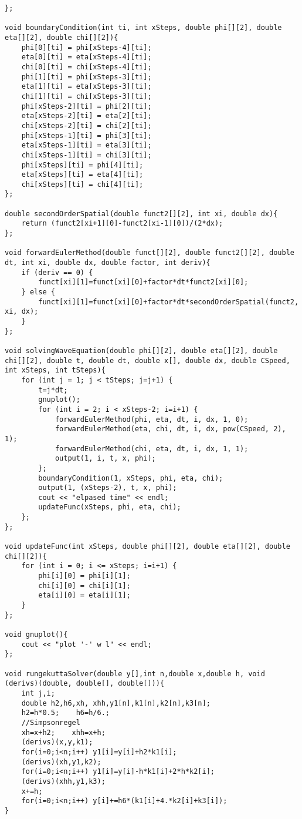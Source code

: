 \documentclass[10pt,fleqn,reqno,a4paper]{article}
\begin{document}
\begin{verbatim}
};

void boundaryCondition(int ti, int xSteps, double phi[][2], double eta[][2], double chi[][2]){
    phi[0][ti] = phi[xSteps-4][ti];
    eta[0][ti] = eta[xSteps-4][ti];
    chi[0][ti] = chi[xSteps-4][ti];
    phi[1][ti] = phi[xSteps-3][ti];
    eta[1][ti] = eta[xSteps-3][ti];
    chi[1][ti] = chi[xSteps-3][ti];
    phi[xSteps-2][ti] = phi[2][ti];
    eta[xSteps-2][ti] = eta[2][ti];
    chi[xSteps-2][ti] = chi[2][ti];
    phi[xSteps-1][ti] = phi[3][ti];
    eta[xSteps-1][ti] = eta[3][ti];
    chi[xSteps-1][ti] = chi[3][ti];
    phi[xSteps][ti] = phi[4][ti];
    eta[xSteps][ti] = eta[4][ti];
    chi[xSteps][ti] = chi[4][ti];
};

double secondOrderSpatial(double funct2[][2], int xi, double dx){
    return (funct2[xi+1][0]-funct2[xi-1][0])/(2*dx);
};

void forwardEulerMethod(double funct[][2], double funct2[][2], double dt, int xi, double dx, double factor, int deriv){
    if (deriv == 0) {
        funct[xi][1]=funct[xi][0]+factor*dt*funct2[xi][0];
    } else {
        funct[xi][1]=funct[xi][0]+factor*dt*secondOrderSpatial(funct2, xi, dx);
    }
};

void solvingWaveEquation(double phi[][2], double eta[][2], double chi[][2], double t, double dt, double x[], double dx, double CSpeed, int xSteps, int tSteps){
    for (int j = 1; j < tSteps; j=j+1) {
        t=j*dt;
        gnuplot();
        for (int i = 2; i < xSteps-2; i=i+1) {
            forwardEulerMethod(phi, eta, dt, i, dx, 1, 0);
            forwardEulerMethod(eta, chi, dt, i, dx, pow(CSpeed, 2), 1);
            forwardEulerMethod(chi, eta, dt, i, dx, 1, 1);
            output(1, i, t, x, phi);
        };
        boundaryCondition(1, xSteps, phi, eta, chi);
        output(1, (xSteps-2), t, x, phi);
        cout << "elpased time" << endl;
        updateFunc(xSteps, phi, eta, chi);
    };
};

void updateFunc(int xSteps, double phi[][2], double eta[][2], double chi[][2]){
    for (int i = 0; i <= xSteps; i=i+1) {
        phi[i][0] = phi[i][1];
        chi[i][0] = chi[i][1];
        eta[i][0] = eta[i][1];
	}
};

void gnuplot(){
    cout << "plot '-' w l" << endl;
};

void rungekuttaSolver(double y[],int n,double x,double h, void (derivs)(double, double[], double[])){
    int j,i;
    double h2,h6,xh, xhh,y1[n],k1[n],k2[n],k3[n];
    h2=h*0.5;    h6=h/6.;
    //Simpsonregel
    xh=x+h2;	xhh=x+h;
    (derivs)(x,y,k1);
    for(i=0;i<n;i++) y1[i]=y[i]+h2*k1[i];
    (derivs)(xh,y1,k2);
    for(i=0;i<n;i++) y1[i]=y[i]-h*k1[i]+2*h*k2[i];
    (derivs)(xhh,y1,k3);
    x+=h;
    for(i=0;i<n;i++) y[i]+=h6*(k1[i]+4.*k2[i]+k3[i]);
}


\end{verbatim}
\end{document}
